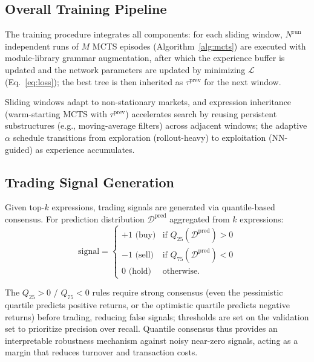 \documentclass{elektr}
\theoremstyle{corollary}
\theoremstyle{lemma}
\theoremstyle{proposition}
\theoremstyle{axiom}
\theoremstyle{conjecture}
\theoremstyle{example}
\theoremstyle{definition}
\theoremstyle{remark}
\begin{document}
\subsection{Overall Training Pipeline}
\label{subsec:pipeline}

The training procedure integrates all components: for each sliding window, $N^{\text{run}}$ independent runs of $M$ MCTS episodes (Algorithm~\ref{alg:mcts}) are executed with module-library grammar augmentation, after which the experience buffer is updated and the network parameters are updated by minimizing $\mathcal{L}$ (Eq.~\ref{eq:loss}); the best tree is then inherited as $\tau^{\text{prev}}$ for the next window.

Sliding windows adapt to non-stationary markets, and expression inheritance (warm-starting MCTS with $\tau^{\text{prev}}$) accelerates search by reusing persistent substructures (e.g., moving-average filters) across adjacent windows; the adaptive $\alpha$ schedule transitions from exploration (rollout-heavy) to exploitation (NN-guided) as experience accumulates.
\subsection{Trading Signal Generation}
\label{subsec:signal}

Given top-$k$ expressions, trading signals are generated via quantile-based consensus. For prediction distribution $\mathcal{D}^{\text{pred}}$ aggregated from $k$ expressions:
\begin{equation}
\text{signal} = \begin{cases}
+1 \text{ (buy)} & \text{if } Q_{25}(\mathcal{D}^{\text{pred}}) > 0 \\
-1 \text{ (sell)} & \text{if } Q_{75}(\mathcal{D}^{\text{pred}}) < 0 \\
0 \text{ (hold)} & \text{otherwise}.
\end{cases}
\label{eq:signal}
\end{equation}

The $Q_{25} > 0$ / $Q_{75} < 0$ rules require strong consensus (even the pessimistic quartile predicts positive returns, or the optimistic quartile predicts negative returns) before trading, reducing false signals; thresholds are set on the validation set to prioritize precision over recall. Quantile consensus thus provides an interpretable robustness mechanism against noisy near-zero signals, acting as a margin that reduces turnover and transaction costs.
\end{document}
